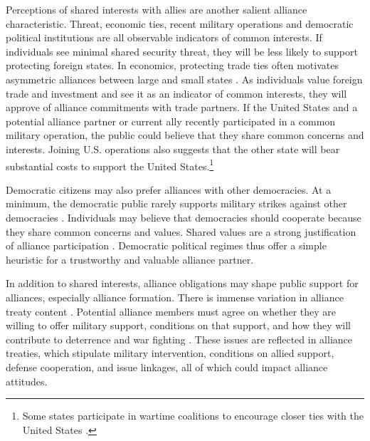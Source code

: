 \documentclass[12pt]{article}
\begin{document}
Perceptions of shared interests with allies are another salient alliance characteristic. 
Threat, economic ties, recent military operations and democratic political institutions are all observable indicators of common interests. 
If individuals see minimal shared security threat, they will be less likely to support protecting foreign states.
In economics, protecting trade ties often motivates asymmetric alliances between large and small states \citep{Fordham2010}. 
As individuals value foreign trade and investment and see it as an indicator of common interests, they will approve of alliance commitments with trade partners. 
If the United States and a potential alliance partner or current ally recently participated in a common military operation, the public could believe that they share common concerns and interests. 
Joining U.S. operations also suggests that the other state will bear substantial costs to support the United States.\footnote{Some states participate in wartime coalitions to encourage closer ties with the United States \citep{GannonKent2020}.}


Democratic citizens may also prefer alliances with other democracies. 
At a minimum, the democratic public rarely supports military strikes against other democracies \citep{TomzWeeks2013}. 
Individuals may believe that democracies should cooperate because they share common concerns and values. 
Shared values are a strong justification of alliance participation \citep{Chuetal2021}. 
Democratic political regimes thus offer a simple heuristic for a trustworthy and valuable alliance partner. 


In addition to shared interests, alliance obligations may shape public support for alliances, especially alliance formation. 
There is immense variation in alliance treaty content \citep{Leedsetal2002}.
Potential alliance members must agree on whether they are willing to offer military support, conditions on that support, and how they will contribute to deterrence and war fighting \citep{Poast2019a}. 
These issues are reflected in alliance treaties, which stipulate military intervention, conditions on allied support, defense cooperation, and issue linkages, all of which could impact alliance attitudes. 
\end{document}
